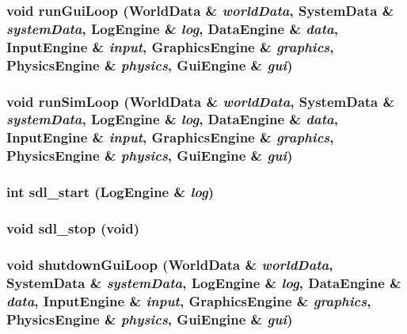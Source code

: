 \subsubsection{\setlength{\rightskip}{0pt plus 5cm}void run\-Gui\-Loop ({\bf World\-Data} \& {\em world\-Data}, {\bf System\-Data} \& {\em system\-Data}, {\bf Log\-Engine} \& {\em log}, {\bf Data\-Engine} \& {\em data}, {\bf Input\-Engine} \& {\em input}, {\bf Graphics\-Engine} \& {\em graphics}, {\bf Physics\-Engine} \& {\em physics}, {\bf Gui\-Engine} \& {\em gui})}\label{main_8cpp_a2}


\subsubsection{\setlength{\rightskip}{0pt plus 5cm}void run\-Sim\-Loop ({\bf World\-Data} \& {\em world\-Data}, {\bf System\-Data} \& {\em system\-Data}, {\bf Log\-Engine} \& {\em log}, {\bf Data\-Engine} \& {\em data}, {\bf Input\-Engine} \& {\em input}, {\bf Graphics\-Engine} \& {\em graphics}, {\bf Physics\-Engine} \& {\em physics}, {\bf Gui\-Engine} \& {\em gui})}\label{main_8cpp_a3}


\subsubsection{\setlength{\rightskip}{0pt plus 5cm}int sdl\_\-start ({\bf Log\-Engine} \& {\em log})}\label{main_8cpp_a0}


\subsubsection{\setlength{\rightskip}{0pt plus 5cm}void sdl\_\-stop (void)}\label{main_8cpp_a1}


\subsubsection{\setlength{\rightskip}{0pt plus 5cm}void shutdown\-Gui\-Loop ({\bf World\-Data} \& {\em world\-Data}, {\bf System\-Data} \& {\em system\-Data}, {\bf Log\-Engine} \& {\em log}, {\bf Data\-Engine} \& {\em data}, {\bf Input\-Engine} \& {\em input}, {\bf Graphics\-Engine} \& {\em graphics}, {\bf Physics\-Engine} \& {\em physics}, {\bf Gui\-Engine} \& {\em gui})}\label{main_8cpp_a7}


